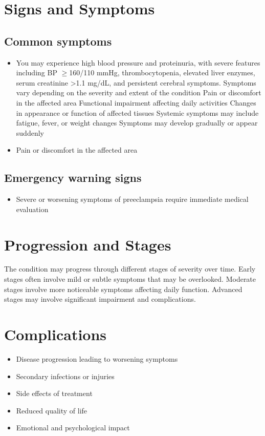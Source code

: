 \section{Signs and Symptoms}

\subsection{Common symptoms}
\begin{itemize}[noitemsep]
  \item You may experience high blood pressure and proteinuria, with severe features including BP $\ge$160/110 mmHg, thrombocytopenia, elevated liver enzymes, serum creatinine >1.1 mg/dL, and persistent cerebral symptoms. Symptoms vary depending on the severity and extent of the condition Pain or discomfort in the affected area Functional impairment affecting daily activities Changes in appearance or function of affected tissues Systemic symptoms may include fatigue, fever, or weight changes Symptoms may develop gradually or appear suddenly
  \item Pain or discomfort in the affected area
  \end{itemize}

\subsection{Emergency warning signs}
\begin{itemize}[noitemsep]
  \item Severe or worsening symptoms of preeclampsia require immediate medical evaluation
\end{itemize}
\section{Progression and Stages}
The condition may progress through different stages of severity over time. Early stages often involve mild or subtle symptoms that may be overlooked. Moderate stages involve more noticeable symptoms affecting daily function. Advanced stages may involve significant impairment and complications.
\section{Complications}
\begin{itemize}[noitemsep]
  \item Disease progression leading to worsening symptoms
  \item Secondary infections or injuries
  \item Side effects of treatment
  \item Reduced quality of life
  \item Emotional and psychological impact
\end{itemize}
